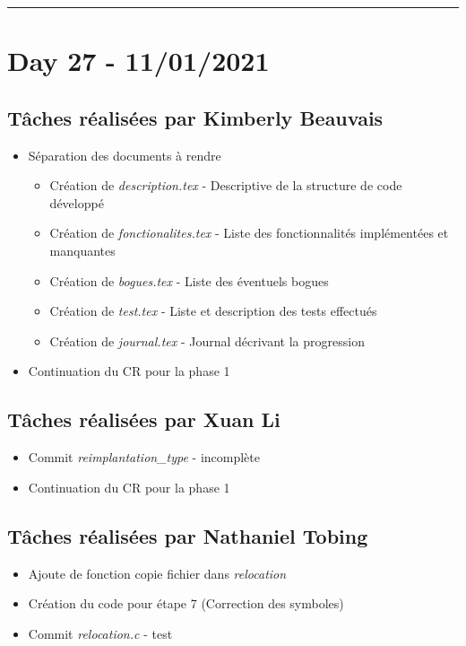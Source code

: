 \documentclass[11pt,letterpaper]{article}
\begin{document}
\noindent\rule{13cm}{0.4pt}

\section*{Day 27 - 11/01/2021}

\subsection*{Tâches réalisées par Kimberly Beauvais}
\begin{itemize}
    \item Séparation des documents à rendre
    \begin{itemize}
        \item Création de \textit{description.tex} - Descriptive de la structure 
        de code développé
        \item Création de \textit{fonctionalites.tex} - Liste des 
        fonctionnalités implémentées et manquantes
        \item Création de \textit{bogues.tex} - Liste des éventuels bogues 
        \item Création de \textit{test.tex} - Liste et description des tests effectués
        \item Création de \textit{journal.tex} - Journal décrivant la progression
    \end{itemize}
    \item Continuation du CR pour la phase 1
\end{itemize}

\subsection*{Tâches réalisées par Xuan Li}
\begin{itemize}
    \item Commit \textit{reimplantation\_type} - incomplète
    \item Continuation du CR pour la phase 1
\end{itemize}

\subsection*{Tâches réalisées par Nathaniel Tobing}
\begin{itemize}
    \item Ajoute de fonction copie fichier dans \textit{relocation} 
    \item Création du code pour étape 7 (Correction des symboles)
    \item Commit \textit{relocation.c} - test
\end{itemize}
\end{document}
